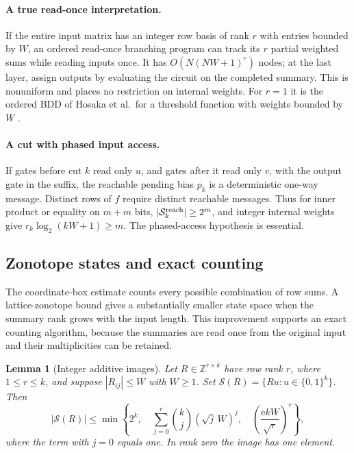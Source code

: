 \documentclass[11pt]{article}
\newtheorem{lemma}[theorem]{Lemma}
\theoremstyle{definition}
\newcommand{\bits}{\{0,1\}}
\newcommand{\Z}{\mathbb Z}
\newcommand{\Eul}{\mathrm e}
\begin{document}
\paragraph{A true read-once interpretation.}
If the entire input matrix has an integer row basis of rank \(r\) with entries bounded by \(W\), an ordered read-once branching program can track its \(r\) partial weighted sums while reading inputs once. It has
\(O(N(NW+1)^r)\) nodes; at the last layer, assign outputs by evaluating the circuit on the completed summary. This is nonuniform and places no restriction on internal weights. For \(r=1\) it is the ordered BDD of Hosaka et al.\ for a threshold function with weights bounded by \(W\) \cite{HTKY97}.

\paragraph{A cut with phased input access.}
If gates before cut \(k\) read only \(u\), and gates after it read only \(v\), with the output gate in the suffix, the reachable pending bias \(p_k\) is a deterministic one-way message. Distinct rows of \(f\) require distinct reachable messages. Thus for inner product or equality on \(m+m\) bits, \(|\mathcal S_k^{\rm reach}|\ge2^m\), and integer internal weights give
\(r_k\log_2(kW+1)\ge m\).
The phased-access hypothesis is essential.

\subsection{Zonotope states and exact counting}\label{sec:zonotope-counting}

The coordinate-box estimate counts every possible combination of row sums.
A lattice-zonotope bound gives a substantially smaller state space when the
summary rank grows with the input length. This improvement supports an exact
counting algorithm, because the summaries are read once from the original
input and their multiplicities can be retained.

\begin{lemma}[Integer additive images]\label{lem:zonotope-image}
Let \(R\in\Z^{r\times k}\) have row rank \(r\), where
\(1\le r\le k\), and suppose \(|R_{ij}|\le W\) with \(W\ge1\).
Set \(\mathcal S(R)=\{Ru:u\in\bits^k\}\). Then
\[
 |\mathcal S(R)|
 \le \min\left\{
  2^k,\quad
  \sum_{j=0}^r\binom kj(\sqrt j\,W)^j,\quad
  \left(\frac{\Eul kW}{\sqrt r}\right)^r
 \right\},                                               \tag{Z1}
\]
where the term with \(j=0\) equals one. In rank zero the image has one element.
\end{lemma}
\end{document}
